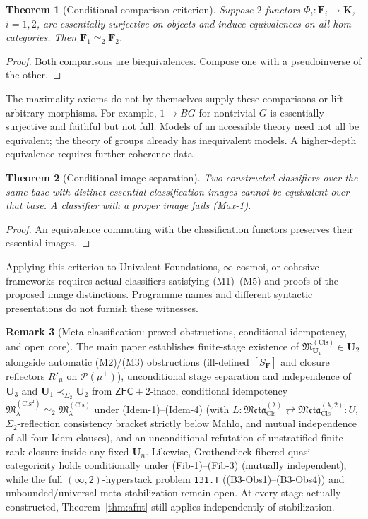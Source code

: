 \documentclass[11pt]{article}
\theoremstyle{plain}
\newtheorem{theorem}{Theorem}[section]
\theoremstyle{definition}
\newtheorem{remark}[theorem]{Remark}
\newcommand{\fM}{\mathfrak{M}}
\newcommand{\Meta}{\mathfrak{Meta}}
\newcommand{\ZFC}{\mathsf{ZFC}}
\begin{document}
\begin{theorem}[Conditional comparison criterion]\label{thm:meta-cat}
Suppose $2$-functors $\Phi_i:\mathbf F_i\to\mathbf K$, $i=1,2$, are essentially surjective on objects and induce equivalences on all hom-categories. Then $\mathbf F_1\simeq_2\mathbf F_2$.
\end{theorem}
\begin{proof}
Both comparisons are biequivalences. Compose one with a pseudoinverse of the other.
\end{proof}
The maximality axioms do not by themselves supply these comparisons or lift arbitrary morphisms. For example, $1\to BG$ for nontrivial $G$ is essentially surjective and faithful but not full. Models of an accessible theory need not all be equivalent; the theory of groups already has inequivalent models. A higher-depth equivalence requires further coherence data.

\begin{theorem}[Conditional image separation]\label{thm:meta-mult}
Two constructed classifiers over the same base with distinct essential classification images cannot be equivalent over that base. A classifier with a proper image fails (Max-1).
\end{theorem}
\begin{proof}
An equivalence commuting with the classification functors preserves their essential images.
\end{proof}
Applying this criterion to Univalent Foundations, $\infty$-cosmoi, or cohesive frameworks requires actual classifiers satisfying (M1)--(M5) and proofs of the proposed image distinctions. Programme names and different syntactic presentations do not furnish these witnesses.

\begin{remark}[Meta-classification: proved obstructions, conditional idempotency, and open core]\label{thm:meta-stab}
The main paper establishes finite-stage existence of $\fM^{(\mathrm{Cls})}_{\mathbf{U}_1} \in \mathbf{U}_2$ alongside automatic \textup{(M2)/(M3)} obstructions (ill-defined $[S_{\mathbf{F}}]$ and closure reflectors $R'_\mu$ on $\mathcal{P}(\mu^+)$), unconditional stage separation and independence of $\mathbf{U}_3$ and $\mathbf{U}_1 \prec_{\Sigma_2} \mathbf{U}_2$ from $\ZFC + 2\text{-inacc}$, conditional idempotency $\fM^{(\mathrm{Cls}^2)}_\lambda \simeq_2 \fM^{(\mathrm{Cls})}_\lambda$ under \textup{(Idem-1)--(Idem-4)} (with $L : \Meta_{\mathrm{Cls}}^{(\lambda)} \rightleftarrows \Meta_{\mathrm{Cls}}^{(\lambda,2)} : U$, $\Sigma_2$-reflection consistency bracket strictly below Mahlo, and mutual independence of all four \textup{Idem} clauses), and an unconditional refutation of unstratified finite-rank closure inside any fixed $\mathbf{U}_n$. Likewise, Grothendieck-fibered quasi-categoricity holds conditionally under \textup{(Fib-1)--(Fib-3)} (mutually independent), while the full $(\infty, 2)$-hyperstack problem \texttt{131.T} (\textup{(B3-Obs1)--(B3-Obs4)}) and unbounded/universal meta-stabilization remain open. At every stage actually constructed, Theorem~\ref{thm:afnt} still applies independently of stabilization.
\end{remark}
\end{document}
